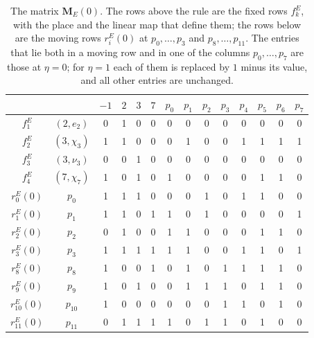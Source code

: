 \documentclass[12pt,oneside,openany]{book}
\theoremstyle{definition}
\theoremstyle{plain}
\numberwithin{equation}{chapter}
\theoremstyle{plain}
\theoremstyle{definition}
\theoremstyle{remark}
\begin{document}
\begin{table}[htbp]
\centering
\setlength{\tabcolsep}{4.2pt}
\caption{The matrix $\mathbf M_E(0)$. The rows above the rule are the fixed rows $f^E_k$, with the place and the linear map that define them; the rows below are the moving rows $r^E_i(0)$ at $p_0,\dots,p_3$ and $p_8,\dots,p_{11}$. The entries that lie both in a moving row and in one of the columns $p_0,\dots,p_7$ are those at $\eta=0$; for $\eta=1$ each of them is replaced by $1$ minus its value, and all other entries are unchanged.}
\label{tab:r6-ME}
\begin{tabular}{cc@{\hspace{10pt}}cccc@{\hspace{12pt}}cccccccc}
\toprule
 & & $-1$ & $2$ & $3$ & $7$ & $p_0$ & $p_1$ & $p_2$ & $p_3$ & $p_4$ & $p_5$ & $p_6$ & $p_7$\\
\midrule
$f^E_1$ & $(2,e_2)$ & 0 & 1 & 0 & 0 & 0 & 0 & 0 & 0 & 0 & 0 & 0 & 0 \\
$f^E_2$ & $(3,\chi_3)$ & 1 & 1 & 0 & 0 & 0 & 1 & 0 & 0 & 1 & 1 & 1 & 1 \\
$f^E_3$ & $(3,\nu_3)$ & 0 & 0 & 1 & 0 & 0 & 0 & 0 & 0 & 0 & 0 & 0 & 0 \\
$f^E_4$ & $(7,\chi_7)$ & 1 & 0 & 1 & 0 & 1 & 0 & 0 & 0 & 0 & 1 & 1 & 0 \\
\midrule
$r^{E}_0(0)$ & $p_0$ & 1 & 1 & 1 & 0 & 0 & 0 & 1 & 0 & 1 & 1 & 0 & 0 \\
$r^{E}_1(0)$ & $p_1$ & 1 & 1 & 0 & 1 & 1 & 0 & 1 & 0 & 0 & 0 & 0 & 1 \\
$r^{E}_2(0)$ & $p_2$ & 0 & 1 & 0 & 0 & 1 & 1 & 0 & 0 & 0 & 1 & 1 & 0 \\
$r^{E}_3(0)$ & $p_3$ & 1 & 1 & 1 & 1 & 1 & 1 & 0 & 0 & 1 & 1 & 0 & 1 \\
$r^{E}_8(0)$ & $p_8$ & 1 & 0 & 0 & 1 & 0 & 1 & 0 & 1 & 1 & 1 & 1 & 0 \\
$r^{E}_9(0)$ & $p_9$ & 1 & 0 & 1 & 0 & 0 & 1 & 1 & 1 & 0 & 1 & 1 & 0 \\
$r^{E}_{10}(0)$ & $p_{10}$ & 1 & 0 & 0 & 0 & 0 & 0 & 0 & 1 & 1 & 0 & 1 & 0 \\
$r^{E}_{11}(0)$ & $p_{11}$ & 0 & 1 & 1 & 1 & 1 & 0 & 1 & 1 & 0 & 1 & 0 & 0 \\
\bottomrule
\end{tabular}
\end{table}
\end{document}
